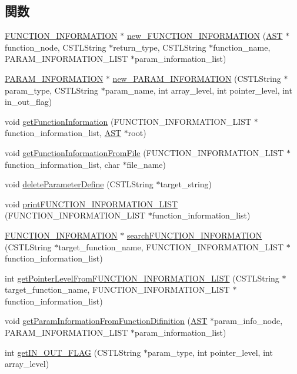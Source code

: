 \subsection*{関数}
\begin{DoxyCompactItemize}
\item 
\hyperlink{structfunction__information}{FUNCTION\_\-INFORMATION} $\ast$ \hyperlink{FunctionInformation_8h_a08e9e7f3d64ef0deeb2d9b6b7590a373}{new\_\-FUNCTION\_\-INFORMATION} (\hyperlink{structabstract__syntax__tree}{AST} $\ast$function\_\-node, CSTLString $\ast$return\_\-type, CSTLString $\ast$function\_\-name, PARAM\_\-INFORMATION\_\-LIST $\ast$param\_\-information\_\-list)
\item 
\hyperlink{structparam__information}{PARAM\_\-INFORMATION} $\ast$ \hyperlink{FunctionInformation_8h_ae6e5d43a10dd5ee5a7f31306c42aadcb}{new\_\-PARAM\_\-INFORMATION} (CSTLString $\ast$param\_\-type, CSTLString $\ast$param\_\-name, int array\_\-level, int pointer\_\-level, int in\_\-out\_\-flag)
\item 
void \hyperlink{FunctionInformation_8h_af12c024074ed26d67e981249f4d73216}{getFunctionInformation} (FUNCTION\_\-INFORMATION\_\-LIST $\ast$function\_\-information\_\-list, \hyperlink{structabstract__syntax__tree}{AST} $\ast$root)
\item 
void \hyperlink{FunctionInformation_8h_acecbefba50732f6a9926d72e926df76d}{getFunctionInformationFromFile} (FUNCTION\_\-INFORMATION\_\-LIST $\ast$function\_\-information\_\-list, char $\ast$file\_\-name)
\item 
void \hyperlink{FunctionInformation_8h_af5bf958c5e789e03ca88250f06328ae5}{deleteParameterDefine} (CSTLString $\ast$target\_\-string)
\item 
void \hyperlink{FunctionInformation_8h_a7970484f0104369f1c54d52852990c73}{printFUNCTION\_\-INFORMATION\_\-LIST} (FUNCTION\_\-INFORMATION\_\-LIST $\ast$function\_\-information\_\-list)
\item 
\hyperlink{structfunction__information}{FUNCTION\_\-INFORMATION} $\ast$ \hyperlink{FunctionInformation_8h_adb4d66844004d42703e1a3bb1653361b}{searchFUNCTION\_\-INFORMATION} (CSTLString $\ast$target\_\-function\_\-name, FUNCTION\_\-INFORMATION\_\-LIST $\ast$function\_\-information\_\-list)
\item 
int \hyperlink{FunctionInformation_8h_af1b60d4c0b4f57c666a46e01db6f01d6}{getPointerLevelFromFUNCTION\_\-INFORMATION\_\-LIST} (CSTLString $\ast$target\_\-function\_\-name, FUNCTION\_\-INFORMATION\_\-LIST $\ast$function\_\-information\_\-list)
\item 
void \hyperlink{FunctionInformation_8h_a90fb29ce9d6e3487e9e5bdc69c4afd7b}{getParamInformationFromFunctionDifinition} (\hyperlink{structabstract__syntax__tree}{AST} $\ast$param\_\-info\_\-node, PARAM\_\-INFORMATION\_\-LIST $\ast$param\_\-information\_\-list)
\item 
int \hyperlink{FunctionInformation_8h_a2f237d512dcb1a72e29ff42aa972a557}{getIN\_\-OUT\_\-FLAG} (CSTLString $\ast$param\_\-type, int pointer\_\-level, int array\_\-level)
\end{DoxyCompactItemize}


